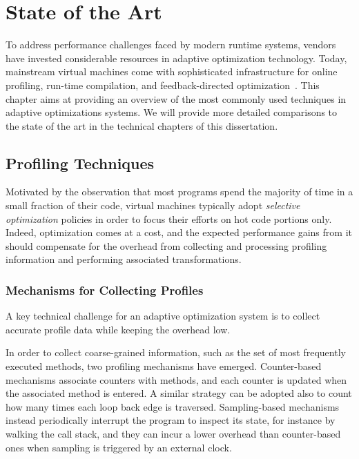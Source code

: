 
\chapter{State of the Art}
\label{ch:literature}

To address performance challenges faced by modern runtime systems, vendors have invested considerable resources in adaptive optimization technology. Today, mainstream virtual machines come with sophisticated infrastructure for online profiling, run-time compilation, and feedback-directed optimization~\cite{Arnold05}. This chapter aims at providing an overview of the most commonly used techniques in adaptive optimizations systems. We will provide more detailed comparisons to the state of the art in the technical chapters of this dissertation.

\section{Profiling Techniques}
Motivated by the observation that most programs spend the majority of time in a small fraction of their code, virtual machines typically adopt {\em selective optimization} policies in order to focus their efforts on hot code portions only. Indeed, optimization comes at a cost, and the expected performance gains from it should compensate for the overhead from collecting and processing profiling information and performing associated transformations.

\subsection*{Mechanisms for Collecting Profiles}
A key technical challenge for an adaptive optimization system is to collect accurate profile data while keeping the overhead low.

In order to collect coarse-grained information, such as the set of most frequently executed methods, two profiling mechanisms have emerged. Counter-based mechanisms associate counters with methods, and each counter is updated when the associated method is entered. A similar strategy can be adopted also to count how many times each loop back edge is traversed. Sampling-based mechanisms instead periodically interrupt the program to inspect its state, for instance by walking the call stack, and they can incur a lower overhead than counter-based ones when sampling is triggered by an external clock.

